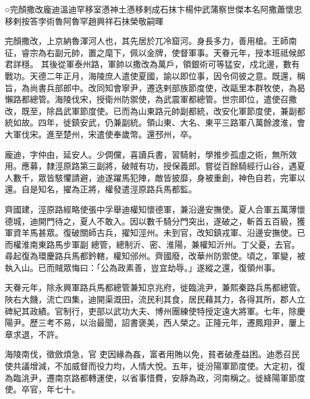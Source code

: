 
\begin{pinyinscope}

 ○完顏撒改龐迪溫迪罕移室懣神土懣移剌成石抹卞楊仲武蒲察世傑本名阿撒蕭懷忠移剌按答孛術魯阿魯罕趙興祥石抹榮敬嗣暉



 完顏撒改，上京納魯渾河人也，其先居於兀冷窟河。身長多力，善用槍。王師南征，睿宗為右副元帥，置之麾下，佩以金牌，使督軍事。天眷元年，授本班祗候郎君詳穩。
 其後從軍泰州路，軍帥以撒改為萬戶，領銀術可等猛安，戍北邊，數有戰功。天德二年正月，海陵庶人遣使夏國，諭以即位事，因令伺彼之意。既還，稱旨，為尚書兵部郎中。改同知會寧尹，遷迭剌部族節度使，改甌里本群牧使，為曷懶路都總管。海陵伐宋，授衛州防禦使，為武震軍都總管。世宗即位，遣使召撒改，既至，除昌武軍節度使。已而為山東路元帥副都統，改安化軍節度使，兼副都統如故。四年，徙鎮安武，仍兼副統。領山東、大名、東平三路軍八萬餘渡淮，會大軍伐宋。進至楚州，宋遣使奉歲幣。還邳州，卒。



 龐迪，字仲由，延安人。少倜儻，喜讀兵書，習騎射，學推步孤虛之術，無所效用。應募，隸涇原路第三副將，破賊有功，授保義郎。嘗從百餘騎經行山谷，遇夏人數千，眾皆駭懼請避，迪遂躍馬犯陣，敵皆披靡，身被重創，神色自若，完軍以還。自是知名，擢為正將，權發遣涇原路兵馬都監。



 齊國建，涇原路經略使張中孚舉迪權知懷德軍，兼沿邊安撫使。夏人合軍五萬薄懷德城，迪開門待之，夏人不敢入。因以數千騎分門突出，遂破之，斬首五百級，獲軍資羊馬甚眾。復破關師古兵，擢知涇州。未到官，改知鎮戎軍、沿邊安撫使。已而權淮南東路馬步軍副
 總管，總制沂、密、淮陽，兼權知沂州。丁父憂，去官。尋起復為環慶路兵馬都鈐轄，權知邠州。齊國廢，改華州防禦使。頃之，軍變，被執入山。已而賊眾悔曰：「公為政素善，豈宜劫辱。」遂縱之還，復領州事。



 天眷元年，除永興軍路兵馬都總管兼知京兆府，徙臨洮尹，兼熙秦路兵馬都總管。陜右大饑，流亡四集，迪開渠溉田，流民利其食，居民藉其力，各得其所，郡人立碑紀其政績。官制行，吏部以武功大夫、博州團練使特授定遠大將軍。七年，除慶陽尹。歷三考不易，以治最聞，詔書褒美，西人榮之。正隆元年，遷鳳翔尹，屢上章求退，不許。



 海陵南伐，徵斂煩急，官
 吏因緣為姦，富者用賄以免，貧者破產益困。迪悉召民使共議增減，不加威督而役力均，人情大悅。五年，徙汾陽軍節度使。大定初，復為臨洮尹，遷南京路都轉運使，以省事惜費，安靜為政，河南稱之。徙絳陽軍節度使。卒官，年七十。




\end{pinyinscope}
